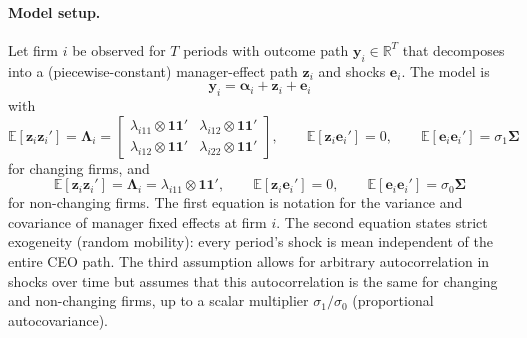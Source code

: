 \documentclass[11pt,a4paper]{article}
\begin{document}
\paragraph{Model setup.} Let firm $i$ be observed for $T$ periods with outcome path $\mathbf y_i\in\mathbb R^T$ that decomposes into a (piecewise-constant) manager-effect path $\mathbf z_i$ and shocks $\mathbf e_i$. The model is
\begin{equation}
\mathbf y_i = \mathbf \alpha_i + \mathbf z_i + \mathbf e_i
\end{equation}
with 
\begin{equation}
\mathbb E[\mathbf z_i\mathbf z_i']= \mathbf \Lambda_i=
\begin{bmatrix}
  \lambda_{i11}\otimes \mathbf{11}' & \lambda_{i12}\otimes \mathbf{11}'\\
  \lambda_{i12}\otimes \mathbf{11}' & \lambda_{i22}\otimes \mathbf{11}'
\end{bmatrix},
\qquad \mathbb E[\mathbf z_i\mathbf e_i']=0,
\qquad \mathbb E[\mathbf e_i\mathbf e_i']=\sigma_1\mathbf\Sigma
\end{equation}
for changing firms, and 
\begin{equation}
\mathbb E[\mathbf z_i\mathbf z_i']= \mathbf \Lambda_i=
  \lambda_{i11}\otimes \mathbf{11}',
\qquad \mathbb E[\mathbf z_i\mathbf e_i']=0,
\qquad \mathbb E[\mathbf e_i\mathbf e_i']=\sigma_0\mathbf\Sigma
\end{equation}
for non-changing firms. The first equation is notation for the variance and covariance of manager fixed effects at firm $i$. The second equation states strict exogeneity (random mobility): every period's shock is mean independent of the entire CEO path. The third assumption allows for arbitrary autocorrelation in shocks over time but assumes that this autocorrelation is the same for changing and non-changing firms, up to a scalar multiplier $\sigma_1/\sigma_0$ (proportional autocovariance).
\end{document}
